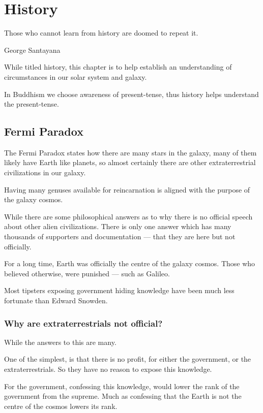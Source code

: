 \documentclass{report}
\begin{document}
\chapter{History}

\epigraph{Those who cannot learn from history are doomed to repeat it.}
{George Santayana}
\smallskip
{}
\bigskip

While titled history, this chapter is to help establish an understanding of
circumstances in our solar system and galaxy.

In Buddhism we choose awareness of present-tense, thus history helps understand
the present-tense. 

\section{Fermi Paradox}
The Fermi Paradox states how there are many stars in the galaxy, many of them
likely have Earth like planets, so almost certainly there are other
extraterrestrial civilizations in our galaxy. 

Having many genuses available for reincarnation is aligned with the purpose of
the galaxy cosmos.

While there are some philosophical answers as to why there is no official speech 
about other alien civilizations. There is only one answer which has many
thousands of supporters and documentation --- that they are here but not 
officially. 

For a long time, Earth was officially the centre of the galaxy cosmos. Those who
believed otherwise, were punished --- such as Galileo.

Most tipsters exposing government hiding knowledge have been much less fortunate
 than Edward Snowden.

\subsection{Why are extraterrestrials not official?}
While the answers to this are many. 

One of the simplest, is that there is no profit, for either the government, or
the extraterrestrials.  So they have no reason to expose this knowledge.

For the government, confessing this knowledge, would lower the rank of the
government from the supreme. Much as confessing that the Earth is not the centre
of the cosmos lowers its rank.
\end{document}

